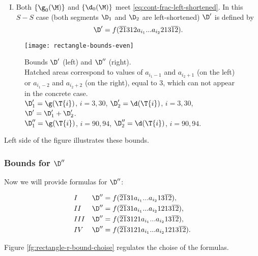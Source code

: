 \begin{enumerate}[I.]
	\item Both $\{\g_0(\M)\}$ and $\{\d_0(\M)\}$
	meet \ref{eq:cont-frac-left-shortened}.
	In this $S-S$ case
	(both segments $\D_1$ and $\D_2$ are left-shortened)
	$\D'$ is defined by
	\begin{equation}
		\D' = f(\overline{21}312a_{i_1}... a_{i_2}213\overline{12}).
	\end{equation}
\end{enumerate}

\begin{figure}[p]
	\centering
	\texttt{[image: rectangle-bounds-even]}
	\caption{
		Bounds $\D'$ (left) and $\D''$ (right).\\
		Hatched areas correspond to values of $a_{i_1 - 1}$ and $a_{i_2 + 1}$ (on the left)
		or $a_{i_1 - 2}$ and $a_{i_2 + 2}$ (on the right), equal to 3,
		which can not appear in the concrete case. \\
		$\D_1' = \g(\T{i})$, $i=3,30$,
		$\D_2' = \d  (\T{i})$, $i=3,30$,
		$\D' = \D_1' + \D_2'$. \\
		$\D_1'' = \g(\T{i})$, $i = 90, 94$,
		$\D_2'' = \d  (\T{i})$, $i = 90, 94$.
	}
	\label{fg:rectangle-bounds-even}
\end{figure}

Left side of the figure  illustrates these bounds.

\subsubsection{Bounds for $\D''$}
Now we will provide formulas for $\D''$:

\begin{subequations}
	\begin{align}
		\label{eq:bound-r-nnn}
		&&&&& I & \D'' & = f(\overline{21}31a_{i_1}... a_{i_2}13\overline{12}), &&&& \\
		\label{eq:bound-r-nns-ns}
		&&&&& II & \D'' & = f(\overline{21}31a_{i_1}... a_{i_2}1213\overline{12}), &&&& \\
		\label{eq:bound-r-ns}
		&&&&& III & \D'' & = f(\overline{21}3121a_{i_1}... a_{i_2}13\overline{12}), &&&& \\
		\label{eq:bound-r-sn}
		&&&&& IV & \D'' & = f(\overline{21}3121a_{i_1}... a_{i_2}1213\overline{12}). &&&&
	\end{align}
\end{subequations}

Figure \ref{fg:rectangle-r-bound-choise} regulates the choise of the formulas.

